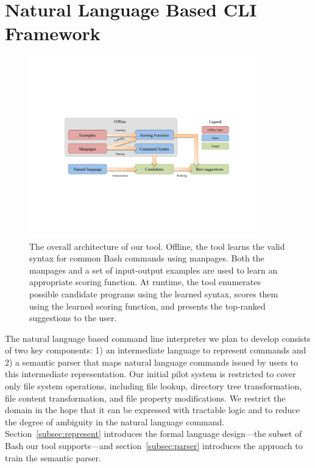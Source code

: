 \section{Natural Language Based CLI Framework}

\begin{figure}[h]
    \begin{center} \includegraphics[width=4in]{architecture.pdf} \end{center}
    \caption{The overall architecture of our tool. Offline, the tool learns the
        valid syntax for common Bash commands using manpages. Both the manpages
        and a set of input-output examples are used to learn an appropriate
        scoring function. At runtime, the tool enumerates possible candidate
        programs using the learned syntax, scores them using the learned scoring
        function, and presents the top-ranked suggestions to the user.}
    \label{fig:arch}
\end{figure}

The natural language based command line interpreter we plan to develop consists of two key components: 1) an intermediate language to represent commands and
2) a semantic parser that maps natural language commands issued by users to this intermediate representation. Our initial pilot system is restricted to cover only file system operations, including file lookup, directory tree transformation, file content transformation, and file property modifications. We restrict the domain in the hope that it can be expressed with tractable logic and to reduce the degree of ambiguity in the natural language command. Section~\ref{subsec:represent} introduces the formal language design---the subset of Bash our tool supports---and section~\ref{subsec:parser} introduces the approach to train the semantic parser.

